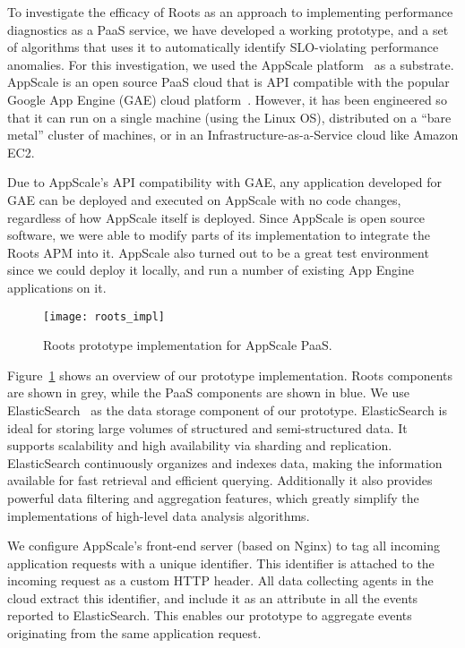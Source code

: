 To investigate the efficacy of Roots as an approach to
implementing performance diagnostics as a PaaS service, we have developed a
working prototype, and a set of algorithms that uses it to automatically
identify SLO-violating performance anomalies.
For this investigation, we used the AppScale
platform~\cite{6488671} as a substrate. AppScale is an open source PaaS cloud
that is API compatible
with the popular Google App Engine (GAE) cloud platform~\cite{gae}.  
However, it has been engineered so that it can run on a
single machine (using the Linux OS), distributed on a ``bare metal'' cluster
of machines, or in an Infrastructure-as-a-Service cloud like Amazon EC2.

Due to AppScale's
API compatibility with GAE, any application developed for GAE can be deployed and
executed on AppScale with no code changes, regardless of how AppScale itself is
deployed. Since AppScale is open source
software, we were able to modify parts of its implementation to integrate the
Roots APM into it. AppScale also turned out to be a great test environment
since we could deploy it locally, and run a number of existing App Engine
applications on it.

\begin{figure}
\centering
\texttt{[image: roots\_impl]}
\caption{Roots prototype implementation for AppScale PaaS.}
\label{fig:roots_impl}
\end{figure}

Figure~\ref{fig:roots_impl} shows an overview of our prototype implementation. Roots components
are shown in grey, while the PaaS components are shown in blue.
We use ElasticSearch~\cite{elasticsearch} as the data storage component of our prototype. ElasticSearch is ideal 
for storing large volumes of structured and semi-structured data. It supports scalability and 
high availability via sharding and replication.
ElasticSearch continuously organizes and indexes data, making the information available 
for fast retrieval and efficient querying. Additionally it also provides
powerful data filtering and aggregation features, which greatly simplify the implementations of high-level
data analysis algorithms.

We configure AppScale's front-end server (based on Nginx) to tag all incoming application requests
with a unique identifier. This identifier is attached to the incoming request as a custom HTTP header.
All data collecting agents in the cloud extract this identifier, and include it as an attribute
in all the events reported to ElasticSearch. This enables our prototype to aggregate events originating
from the same application request.

